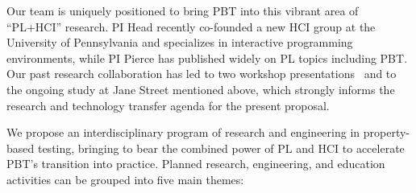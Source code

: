 Our team
is uniquely positioned to bring PBT into this vibrant area
of ``PL+HCI'' research.  PI Head recently
co-founded a new HCI group at
the University of Pennsylvania and specializes in interactive
programming environments, while PI Pierce has published widely on PL
topics including PBT.  Our past research collaboration has led to
two workshop
presentations~\cite{goldstein_problems_2022,shi_towards_2023} and to the ongoing
study at Jane Street mentioned above, which strongly informs the
research and technology transfer agenda for the present proposal.

\smallskip

We propose an interdisciplinary program of research and
engineering in
{property-based testing}, bringing to
bear the combined power of PL and HCI to accelerate PBT's transition
into practice.
%
Planned research,
engineering, and education activities can be grouped into five main
themes: 
